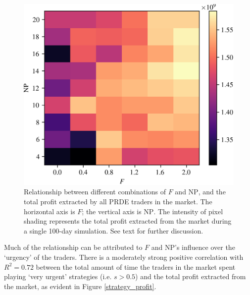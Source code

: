 \documentclass[a4paper,twoside]{article}
\begin{document}
\begin{figure}[htbp]
    \centerline{\includegraphics[width=\columnwidth]{profit_grid.png}}
    \caption{
        Relationship between different combinations of $F$ and $\mathrm{NP}$, and the total profit extracted by all PRDE traders in the market.
        The horizontal axis is $F$; the vertical axis is $\mathrm{NP}$.
        The intensity of pixel shading represents the total profit extracted from the market during a single 100-day simulation.
        See text for further discussion.
    }
    \label{profit_grid}
\end{figure}

Much of the relationship can be attributed to $F$ and $\mathrm{NP}$'s influence over the `urgency' of the traders.
There is a moderately strong positive correlation with $R^2=0.72$ between the total amount of time the traders in the market spent playing `very urgent' strategies (i.e. $s>0.5$) and the total profit extracted from the market, as evident in Figure \ref{strategy_profit}.
\end{document}
